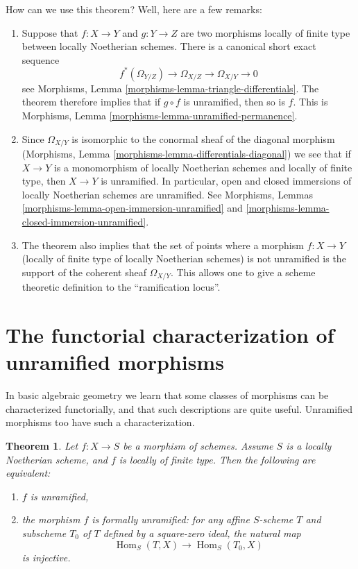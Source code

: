 \documentclass{stacks-project}
\theoremstyle{plain}
\newtheorem{theorem}[subsection]{Theorem}
\theoremstyle{definition}
\theoremstyle{remark}
\numberwithin{equation}{subsection}
\def\Hom{\mathop{\mathrm{Hom}}\nolimits}
\begin{document}
\noindent
How can we use this theorem? Well, here are a few remarks:
\begin{enumerate}
\item Suppose that
$f : X \to Y$ and $g : Y \to Z$ are two morphisms locally of finite
type between locally Noetherian schemes. There is a canonical short
exact sequence
$$
f^*(\Omega_{Y/Z}) \to \Omega_{X/Z} \to \Omega_{X/Y} \to 0
$$
see Morphisms, Lemma \ref{morphisms-lemma-triangle-differentials}.
The theorem therefore implies that if $g \circ f$ is unramified,
then so is $f$. This is
Morphisms, Lemma \ref{morphisms-lemma-unramified-permanence}.
\item Since $\Omega_{X/Y}$ is isomorphic to the conormal sheaf
of the diagonal morphism
(Morphisms, Lemma \ref{morphisms-lemma-differentials-diagonal})
we see that if $X \to Y$ is a monomorphism of
locally Noetherian schemes and locally of finite type,
then $X \to Y$ is unramified.
In particular, open and closed immersions of locally Noetherian schemes
are unramified. See
Morphisms, Lemmas
\ref{morphisms-lemma-open-immersion-unramified} and
\ref{morphisms-lemma-closed-immersion-unramified}.
\item The theorem also implies that the set of points
where a morphism $f : X \to Y$ (locally of finite type of locally Noetherian
schemes) is not unramified is
the support of the coherent sheaf $\Omega_{X/Y}$.
This allows one to give a scheme theoretic definition to the
``ramification locus''.
\end{enumerate}

\section{The functorial characterization of unramified morphisms}
\label{section-functorial-unramified}

\noindent
In basic algebraic geometry we learn that some classes of morphisms can be
characterized functorially, and that such descriptions are quite useful.
Unramified morphisms too have such a characterization.

\begin{theorem}
\label{theorem-formally-unramified}
Let $f : X \to S$ be a morphism of schemes.
Assume $S$ is a locally Noetherian scheme, and $f$ is locally of finite type.
Then the following are equivalent:
\begin{enumerate}
\item $f$ is unramified,
\item the morphism $f$ is formally unramified:
for any affine $S$-scheme $T$ and subscheme $T_0$ of $T$
defined by a square-zero ideal,
the natural map
$$
\Hom_S(T, X) \longrightarrow \Hom_S(T_0, X)
$$
is injective.
\end{enumerate}
\end{theorem}
\end{document}
